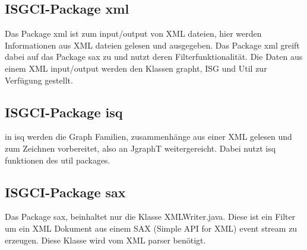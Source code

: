 \documentclass[10pt,a4paper]{article}
\begin{document}
\subsection{ISGCI-Package xml}
Das Package xml ist zum  input/output von XML dateien, hier werden Informationen aus XML dateien gelesen und ausgegeben. Das Package xml greift dabei auf das Package sax zu und nutzt deren Filterfunktionalität. Die Daten aus einem XML input/output werden den Klassen grapht, ISG und Util zur Verfügung gestellt. \\

\subsection{ISGCI-Package isq}
in isq werden die Graph Familien, zusammenhänge aus einer XML gelesen und zum Zeichnen vorbereitet, also an JgraphT weitergereicht. Dabei nutzt isq funktionen des util packages. 

\subsection{ISGCI-Package sax}
Das Package sax, beinhaltet nur die Klasse XMLWriter.java. Diese ist ein Filter um ein XML Dokument aus einem SAX (Simple API for XML) event stream zu erzeugen. Diese Klasse wird vom XML parser benötigt.
\end{document}
